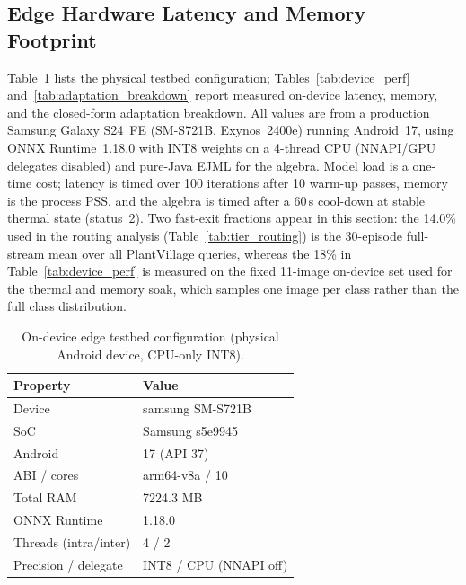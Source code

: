 \documentclass[preprint,12pt]{elsarticle}
\begin{document}
\subsection{Edge Hardware Latency and Memory Footprint}
\label{sec:edge_hardware}
Table~\ref{tab:device_spec} lists the physical testbed configuration; Tables~\ref{tab:device_perf} and~\ref{tab:adaptation_breakdown} report measured on-device latency, memory, and the closed-form adaptation breakdown. All values are from a production Samsung Galaxy S24~FE (SM-S721B, Exynos~2400e) running Android~17, using ONNX Runtime~1.18.0 with INT8 weights on a 4-thread CPU (NNAPI/GPU delegates disabled) and pure-Java EJML for the algebra. Model load is a one-time cost; latency is timed over 100 iterations after 10 warm-up passes, memory is the process PSS, and the algebra is timed after a 60\,s cool-down at stable thermal state (status~2). Two fast-exit fractions appear in this section: the 14.0\% used in the routing analysis (Table~\ref{tab:tier_routing}) is the 30-episode full-stream mean over all PlantVillage queries, whereas the 18\% in Table~\ref{tab:device_perf} is measured on the fixed 11-image on-device set used for the thermal and memory soak, which samples one image per class rather than the full class distribution.

\begin{table}[htbp]
\centering
\caption{On-device edge testbed configuration (physical Android device, CPU-only INT8).}
\label{tab:device_spec}
\footnotesize
\begin{tabular}{ll}
\toprule
Property & Value \\
\midrule
Device & samsung SM-S721B \\
SoC & Samsung s5e9945 \\
Android & 17 (API 37) \\
ABI / cores & arm64-v8a / 10 \\
Total RAM & 7224.3 MB \\
ONNX Runtime & 1.18.0 \\
Threads (intra/inter) & 4 / 2 \\
Precision / delegate & INT8 / CPU (NNAPI off) \\
\bottomrule
\end{tabular}
\end{table}
\end{document}
